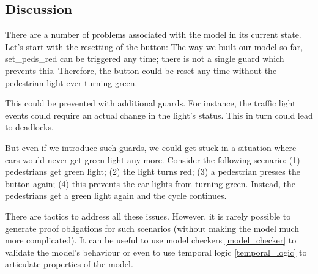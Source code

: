 \subsection{Discussion}

There are a number of problems associated with the model in its current state.  Let's start with the resetting of the button: The way we built our model so far, \textsf{set\_peds\_red} can be triggered any time; there is not a single guard which prevents this.  Therefore, the button could be reset any time without the pedestrian light ever turning green.

This could be prevented with additional guards. For instance, the traffic light events could require an actual change in the light's status.  This in turn could lead to deadlocks.

But even if we introduce such guards, we could get stuck in a situation where cars would never get green light any more.  Consider the following scenario: (1) pedestrians get green light; (2) the light turns red; (3) a pedestrian presses the button again; (4) this prevents the car lights from turning green. Instead, the pedestrians get a green light again and the cycle continues.

There are tactics to address all these issues.  However, it is rarely possible to generate proof obligations for such scenarios (without making the model much more complicated).  It can be useful to use model checkers \ref{model_checker} to validate the model's behaviour or even to use temporal logic \ref{temporal_logic} to articulate properties of the model.



